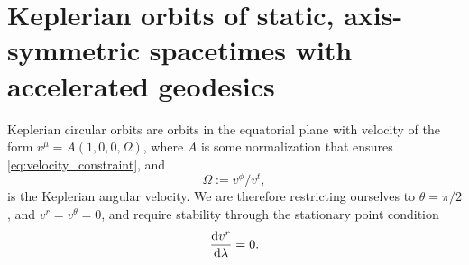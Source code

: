 \section{Keplerian orbits of static, axis-symmetric spacetimes with accelerated geodesics}
\label{appendix:circular-orbits}

Keplerian circular orbits are orbits in the equatorial plane with velocity of the form $v^\mu = A(1, 0, 0, \Omega)$, where $A$ is some normalization that ensures \eqref{eq:velocity_constraint}, and
\begin{equation}
    \label{eq:keplerian-angular-velocity}
    \Omega := v^\phi / v^t,
\end{equation}
is the Keplerian angular velocity. We are therefore restricting ourselves to $\theta = \pi/2$, and $v^r = v^\theta = 0$, and require stability through the stationary point condition
\begin{equation}
    \frac{\text{d} v^r}{\text{d} \lambda} = 0.
\end{equation}

